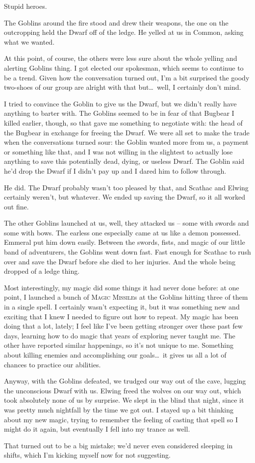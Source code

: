 Stupid heroes.

The Goblins around the fire stood and drew their weapons, the one on the outcropping held the Dwarf off of the ledge. He yelled at us in Common, asking what we wanted.

At this point, of course, the others were less sure about the whole yelling and alerting Goblins thing. I got elected our spokesman, which seems to continue to be a trend. Given how the conversation turned out, I'm a bit surprised the goody two-shoes of our group are alright with that but\dots\ well, I certainly don't mind.

I tried to convince the Goblin to give us the Dwarf, but we didn't really have anything to barter with. The Goblins seemed to be in fear of that Bugbear I killed earlier, though, so that gave me something to negotiate with: the head of the Bugbear in exchange for freeing the Dwarf. We were all set to make the trade when the conversations turned sour: the Goblin wanted more from us, a payment or something like that, and I was not willing in the slightest to actually lose anything to save this potentially dead, dying, or useless Dwarf. The Goblin said he'd drop the Dwarf if I didn't pay up and I dared him to follow through.

He did. The Dwarf probably wasn't too pleased by that, and Scathac and Elwing certainly weren't, but whatever. We ended up saving the Dwarf, so it all worked out fine.

The other Goblins launched at us, well, they attacked us -- some with swords and some with bows. The earless one especially came at us like a demon possessed. Emmeral put him down easily. Between the swords, fists, and magic of our little band of adventurers, the Goblins went down fast. Fast enough for Scathac to rush over and save the Dwarf before she died to her injuries. And the whole being dropped of a ledge thing.

Most interestingly, my magic did some things it had never done before: at one point, I launched a bunch of \textsc{Magic Missile}s at the Goblins hitting three of them in a single spell. I certainly wasn't expecting it, but it was something new and exciting that I knew I needed to figure out how to repeat. My magic has been doing that a lot, lately; I feel like I've been getting stronger over these past few days, learning how to do magic that years of exploring never taught me. The other have reported similar happenings, so it's not unique to me. Something about killing enemies and accomplishing our goals\dots\ it gives us all a lot of chances to practice our abilities.

Anyway, with the Goblins defeated, we trudged our way out of the cave, lugging the unconscious Dwarf with us. Elwing freed the wolves on our way out, which took absolutely none of us by surprise. We slept in the blind that night, since it was pretty much nightfall by the time we got out. I stayed up a bit thinking about my new magic, trying to remember the feeling of casting that spell so I might do it again, but eventually I fell into my trance as well.

That turned out to be a big mistake; we'd never even considered sleeping in shifts, which I'm kicking myself now for not suggesting.

\sleep
